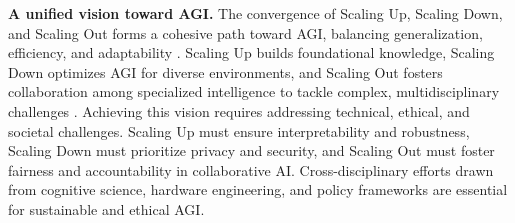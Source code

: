 \textbf{A unified vision toward AGI.}
The convergence of Scaling Up, Scaling Down, and Scaling Out forms a cohesive path toward AGI, balancing generalization, efficiency, and adaptability \cite{bostrom2014superintelligence}. Scaling Up builds foundational knowledge, Scaling Down optimizes AGI for diverse environments, and Scaling Out fosters collaboration among specialized intelligence to tackle complex, multidisciplinary challenges \cite{goertzel2006agi}.
Achieving this vision requires addressing technical, ethical, and societal challenges. Scaling Up must ensure interpretability and robustness, Scaling Down must prioritize privacy and security, and Scaling Out must foster fairness and accountability in collaborative AI. Cross-disciplinary efforts drawn from cognitive science, hardware engineering, and policy frameworks are essential for sustainable and ethical AGI.